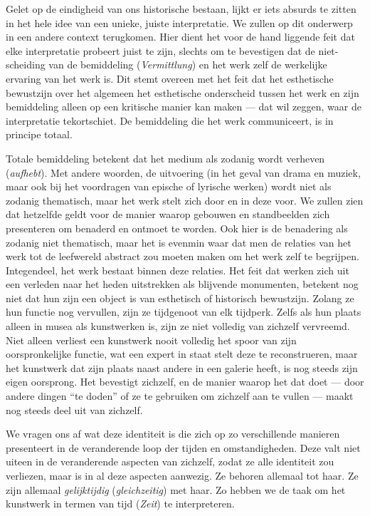 Gelet op de eindigheid van ons historische bestaan, lijkt er iets absurds te zitten in het hele idee van een unieke, juiste interpretatie. We zullen op dit onderwerp in een andere context terugkomen. Hier dient het voor de hand liggende feit dat elke interpretatie probeert juist te zijn, slechts om te bevestigen dat de niet-scheiding van de bemiddeling (\textit{Vermittlung}) en het werk zelf de werkelijke ervaring van het werk is. Dit stemt overeen met het feit dat het esthetische bewustzijn over het algemeen het esthetische onderscheid tussen het werk en zijn bemiddeling alleen op een kritische manier kan maken — dat wil zeggen, waar de interpretatie tekortschiet. De bemiddeling die het werk communiceert, is in principe totaal.

Totale bemiddeling betekent dat het medium als zodanig wordt verheven (\textit{aufhebt}). Met andere woorden, de uitvoering (in het geval van drama en muziek, maar ook bij het voordragen van epische of lyrische werken) wordt niet als zodanig thematisch, maar het werk stelt zich door en in deze voor. We zullen zien dat hetzelfde geldt voor de manier waarop gebouwen en standbeelden zich presenteren om benaderd en ontmoet te worden. Ook hier is de benadering als zodanig niet thematisch, maar het is evenmin waar dat men de relaties van het werk tot de leefwereld abstract zou moeten maken om het werk zelf te begrijpen. Integendeel, het werk bestaat binnen deze relaties. Het feit dat werken zich uit een verleden naar het heden uitstrekken als blijvende monumenten, betekent nog niet dat hun zijn een object is van esthetisch of historisch bewustzijn. Zolang ze hun functie nog vervullen, zijn ze tijdgenoot van elk tijdperk. Zelfs als hun plaats alleen in musea als kunstwerken is, zijn ze niet volledig van zichzelf vervreemd. Niet alleen verliest een kunstwerk nooit volledig het spoor van zijn oorspronkelijke functie, wat een expert in staat stelt deze te reconstrueren, maar het kunstwerk dat zijn plaats naast andere in een galerie heeft, is nog steeds zijn eigen oorsprong. Het bevestigt zichzelf, en de manier waarop het dat doet — door andere dingen ``te doden'' of ze te gebruiken om zichzelf aan te vullen — maakt nog steeds deel uit van zichzelf.

We vragen ons af wat deze identiteit is die zich op zo verschillende manieren presenteert in de veranderende loop der tijden en omstandigheden. Deze valt niet uiteen in de veranderende aspecten van zichzelf, zodat ze alle identiteit zou verliezen, maar is in al deze aspecten aanwezig. Ze behoren allemaal tot haar. Ze zijn allemaal \textit{gelijktijdig} (\textit{gleichzeitig}) met haar. Zo hebben we de taak om het kunstwerk in termen van tijd (\textit{Zeit}) te interpreteren.

